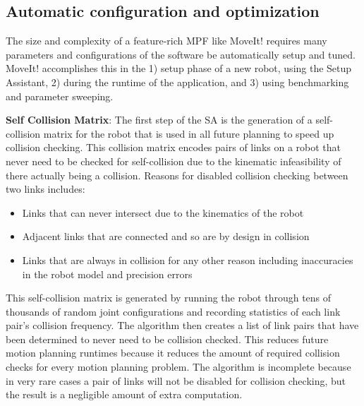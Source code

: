 \documentclass[10pt,journal,compsoc]{joser1}
\begin{document}
{%
\subsection{Automatic configuration and optimization}

The size and complexity of a feature-rich MPF like MoveIt! requires many parameters and configurations of the software be automatically setup and tuned. MoveIt! accomplishes this in the 1) setup phase of a new robot, using the Setup Assistant, 2) during the runtime of the application, and 3) using benchmarking and parameter sweeping\cite{cohen2012generic}.

{\bf Self Collision Matrix}: The first step of the SA is the generation of a self-collision matrix for the robot that is used in all future planning to speed up collision checking. This collision matrix encodes pairs of links on a robot that never need to be checked for self-collision due to the kinematic infeasibility of there actually being a collision. Reasons for disabled collision checking between two links includes:
\begin{itemize}
    \item Links that can never intersect due to the kinematics of the robot
    \item Adjacent links that are connected and so are by design in collision
    \item Links that are always in collision for any other reason including inaccuracies in the robot model and precision errors
\end{itemize}

This self-collision matrix is generated by running the robot through tens of thousands of random joint configurations and recording statistics of each link pair's collision frequency. The algorithm then creates a list of link pairs that have been determined to never need to be collision checked. This reduces future motion planning runtimes because it reduces the amount of required collision checks for every motion planning problem. The algorithm is incomplete because in very rare cases a pair of links will not be disabled for collision checking, but the result is a negligible amount of extra computation.

}
\end{document}
